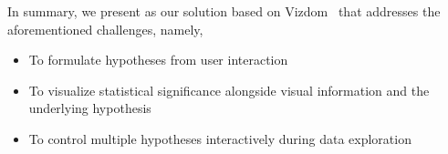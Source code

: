 In summary, we present \system{} as our solution based on Vizdom~\cite{vizdom} that addresses the aforementioned challenges, namely,
\begin{itemize}
    \item To formulate hypotheses from user interaction
    \item To visualize statistical significance alongside visual information and the underlying hypothesis
    \item To control multiple hypotheses interactively during data exploration
\end{itemize}
